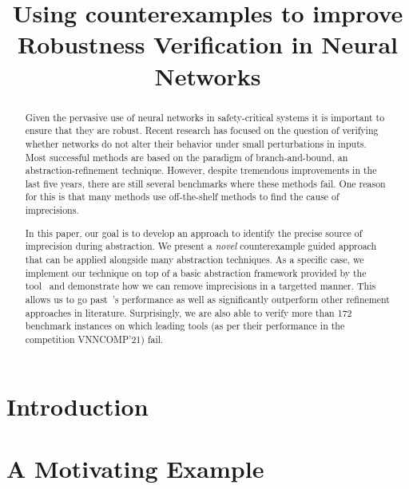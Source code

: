 \documentclass{llncs}
\title{Using counterexamples to improve Robustness Verification in Neural Networks}
\author{}
\institute{}
\begin{document}
\maketitle

\begin{abstract}
  Given the pervasive use of neural networks in safety-critical systems it is important to ensure that they are robust. Recent research has focused on the question of verifying whether networks do not alter their behavior under small perturbations in inputs. Most successful methods are based on the paradigm of branch-and-bound, an abstraction-refinement technique. However, despite tremendous improvements in the last five years, there are still several benchmarks where these methods fail. One reason for this is that many methods use off-the-shelf methods to find the cause of imprecisions.  

  In this paper, our goal is to develop an approach to identify the precise source of imprecision during abstraction. We present a {\em novel} counterexample guided approach that can be applied alongside many abstraction techniques. As a specific case, we implement our technique on top of a basic abstraction framework provided by the tool~\deeppoly{} and demonstrate how we can remove imprecisions in a targetted manner. This allows us to go past~\deeppoly{}'s performance as well as significantly outperform other refinement approaches in literature. Surprisingly, we are also able to verify more than 172 benchmark instances on which leading tools (as per their performance in the competition VNNCOMP'21) fail. 

\end{abstract}

\section{Introduction}
\label{sec:intro}



\section{A Motivating Example}
\label{sec:motivation}

\end{document}
